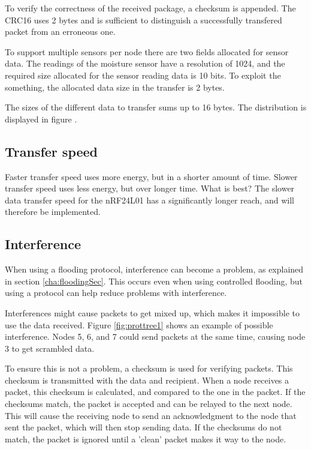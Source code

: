 To verify the correctness of the received package, a checksum is appended. The CRC16 uses 2 bytes and is sufficient to distinguish a successfully transfered packet from an erroneous one. 

To support multiple sensors per node there are two fields allocated for sensor data.
The readings of the moisture sensor have a resolution of 1024, and the required size allocated for the sensor reading data is 10 bits. To exploit the something, the allocated data size in the transfer is 2 bytes.

The sizes of the different data to transfer sums up to 16 bytes. The distribution is displayed in figure .

\subsection{Transfer speed}
Faster transfer speed uses more energy, but in a shorter amount of time. Slower transfer speed uses less energy, but over longer time. What is best? The slower data transfer speed for the nRF24L01 has a significantly longer reach, and will therefore be implemented. 

\subsection{Interference}
When using a flooding protocol, interference can become a problem, as explained in section \ref{cha:floodingSec}. This occurs even when using controlled flooding, but using a protocol can help reduce problems with interference.

Interferences might cause packets to get mixed up, which makes it impossible to use the data received. Figure \ref{fig:prottree1} shows an example of possible interference. Nodes 5, 6, and 7 could send packets at the same time, causing node 3 to get scrambled data.

To ensure this is not a problem, a checksum is used for verifying packets. This checksum is transmitted with the data and recipient. When a node receives a packet, this checksum is calculated, and compared to the one in the packet. If the checksums match, the packet is accepted and can be relayed to the next node. This will cause the receiving node to send an acknowledgment to the node that sent the packet, which will then stop sending data.
If the checksums do not match, the packet is ignored until a 'clean' packet makes it way to the node.

